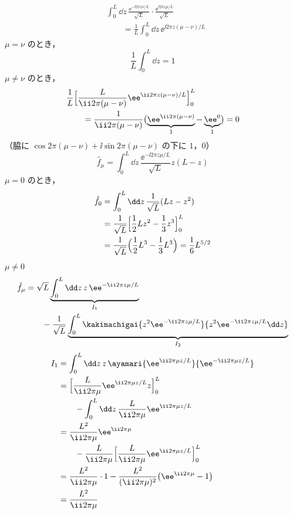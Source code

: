 \begin{align*}
  &\int_{0}^{L}\dd z\,\frac{\ee^{-\ii2\pi z\nu/L}}{\sqrt{L}}\cdot\frac{\ee^{\ii2\pi z\mu/L}}{\sqrt{L}}\\
  &\qquad=\frac{1}{L}\int_{0}^{L}\dd z\,\ee^{\ii2\pi z(\mu-\nu)/L}
\end{align*}
$\mu=\nu$ のとき，
\[ \frac{1}{L}\int_{0}^{L}\dd z=1 \]
$\mu\neq\nu$ のとき，
\begin{align*}
  &\frac{1}{L}\Bigl[\frac{L}{\ii2\pi(\mu-\nu)}\ee^{\ii2\pi z(\mu-\nu)/L}\Bigr]_{0}^{L}\\
  &\qquad=\frac{1}{\ii2\pi(\mu-\nu)}\bigl(\underbrace{\ee^{\ii2\pi(\mu-\nu)}}_{1}-\underbrace{\ee^{0}}_{1}\bigr)=0
\end{align*}
（脇に $\cos2\pi(\mu-\nu)+\ii\sin2\pi(\mu-\nu)$ の下に $1$，$0$）
\[
  \hat{f}_{\mu}=\int_{0}^{L}\dd z\,\frac{\ee^{-\ii2\pi z\mu/L}}{\sqrt{L}}z(L-z)
\]
$\mu=0$ のとき，
\begin{align*}
  \hat{f}_0&=\int_{0}^{L}\dd z\,\frac{1}{\sqrt{L}}(Lz-z^{2})\\
  &=\frac{1}{\sqrt{L}}\Bigl[\frac{1}{2}Lz^{2}-\frac{1}{3}z^{3}\Bigr]_{0}^{L}\\
  &=\frac{1}{\sqrt{L}}\Bigl(\frac{1}{2}L^{3}-\frac{1}{3}L^{3}\Bigr)=\frac{1}{6}L^{5/2}
\end{align*}
$\mu\neq0$
\begin{align*}
  \hat{f}_{\mu}&=\sqrt{L}\underbrace{\int_{0}^{L}\dd z\,z\,\ee^{-\ii2\pi z\mu/L}}_{I_1}\\
  &\qquad-\frac{1}{\sqrt{L}}\underbrace{\int_{0}^{L}\kakimachigai{z^{2}\ee^{-\ii2\pi z\mu/L}}{z^{2}\ee^{-\ii2\pi z\mu/L}\dd z}}_{I_2}
\end{align*}
\begin{align*}
  I_1&=\int_{0}^{L}\dd z\,z\,\ayamari{\ee^{\ii2\pi\mu z/L}}{\ee^{-\ii2\pi\mu z/L}}\\
  &=\Bigl[\frac{L}{\ii2\pi\mu}\ee^{\ii2\pi\mu z/L}z\Bigr]_{0}^{L}\\
  &\qquad-\int_{0}^{L}\dd z\,\frac{L}{\ii2\pi\mu}\ee^{\ii2\pi\mu z/L}\\
  &=\frac{L^{2}}{\ii2\pi\mu}\ee^{\ii2\pi\mu}\\
  &\qquad-\frac{L}{\ii2\pi\mu}\Bigl[\frac{L}{\ii2\pi\mu}\ee^{\ii2\pi\mu z/L}\Bigr]_{0}^{L}\\
  &=\frac{L^{2}}{\ii2\pi\mu}\cdot1-\frac{L^{2}}{(\ii2\pi\mu)^{2}}\bigl(\ee^{\ii2\pi\mu}-1\bigr)\\
  &=\frac{L^{2}}{\ii2\pi\mu}
\end{align*}
